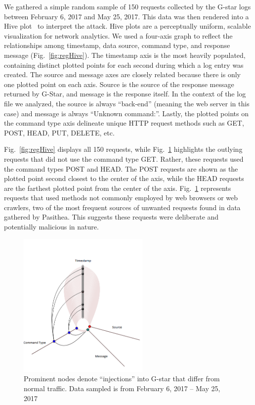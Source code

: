 We gathered a simple random sample of 150 requests collected by the G-star logs between February 6, 2017 and May 25, 2017.  
This data was then rendered into a Hive plot~\cite{Hive-Plot} to interpret the attack. 
Hive plots are a perceptually uniform, scalable visualization for network analytics.  
We used a four-axis graph to reflect the relationships among timestamp, data source, command type, and response message (Fig.~\ref{fig:regHive}). 
The timestamp axis is the most heavily populated, containing distinct plotted points for each second during which a log entry was created. 
The source and message axes are closely related because there is only one plotted point on each axis. 
Source is the source of the response message returned by G-Star, and message is the response itself. 
In the context of the log file we analyzed, the source is always ``back-end'' (meaning the web server in this case) and message is always ``Unknown command:''. 
Lastly, the plotted points on the command type axis delineate unique HTTP request methods such as GET, POST, HEAD, PUT, DELETE, etc.

Fig.~\ref{fig:regHive} displays all 150 requests, while Fig.~\ref{fig:uniqHive} highlights the outlying requests that did not use the command type GET.  
Rather, these requests used the command types POST and HEAD. 
The POST requests are shown as the plotted point second closest to the center of the axis, while the HEAD requests are the farthest plotted point from the center of the axis. 
Fig.~\ref{fig:uniqHive} represents requests that used methods not commonly employed by web browsers or web crawlers, two of the most frequent sources of unwanted requests found in data gathered by Pasithea. 
This suggests these requests were deliberate and potentially malicious in nature.

\begin{figure}[t]
   \centering
   \includegraphics[width=2.5in]{images/uniqHive.png} 
   \caption{Prominent nodes denote ``injections'' into G-star that differ from normal traffic. Data sampled is from February 6, 2017 -- May 25, 2017}
   \label{fig:uniqHive}
\end{figure}

